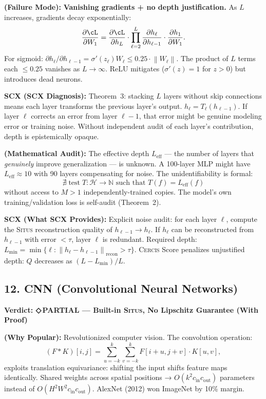 \documentclass[12pt,a4paper]{article}
\theoremstyle{definition}
\newcommand{\weakness}{{\color{weakcolor}\textbf{◇\,PARTIAL}}}
\newcommand{\Situs}{\textsc{Situs}}
\newcommand{\Cercis}{\textsc{Cercis}}
\newcommand{\N}{\mathbb{N}}
\newcommand{\cH}{\mathcal{H}}
\newcommand{\norm}[1]{\left\lVert#1\right\rVert}
\newcommand{\auditHeader}[1]{\medskip\noindent\textbf{\large #1}\medskip}
\newcommand{\whyPopular}{\noindent\textbf{ (Why Popular):} }
\newcommand{\whyFail}{\noindent\textbf{ (Failure Mode):} }
\newcommand{\whatMissing}{\noindent\textbf{SCX (What SCX Provides):} }
\newcommand{\diagnosis}{\noindent\textbf{SCX (SCX Diagnosis):} }
\newcommand{\mathAudit}{\noindent\textbf{ (Mathematical Audit):} }
\begin{document}
\whyFail{} \textbf{Vanishing gradients + no depth justification.} As $L$ increases, gradients decay exponentially:
\[
\frac{\partial \cL}{\partial W_1} = \frac{\partial \cL}{\partial h_L} \cdot \prod_{\ell=2}^L \frac{\partial h_\ell}{\partial h_{\ell-1}} \cdot \frac{\partial h_1}{\partial W_1}.
\]
For sigmoid: $\partial h_\ell / \partial h_{\ell-1} = \sigma'(z_\ell) W_\ell \le 0.25 \cdot \norm{W_\ell}$. The product of $L$ terms each $\le 0.25$ vanishes as $L \to \infty$. ReLU mitigates ($\sigma'(z) = 1$ for $z > 0$) but introduces dead neurons.

\diagnosis{} Theorem~3: stacking $L$ layers without skip connections means each layer transforms the previous layer's output. $h_\ell = T_\ell(h_{\ell-1})$. If layer $\ell$ corrects an error from layer $\ell-1$, that error might be genuine modeling error or training noise. Without independent audit of each layer's contribution, depth is epistemically opaque.

\mathAudit{} The effective depth $L_{\text{eff}}$ — the number of layers that \textit{genuinely} improve generalization — is unknown. A 100-layer MLP might have $L_{\text{eff}} \approx 10$ with 90 layers compensating for noise. The unidentifiability is formal:
\[
\nexists \; \text{test} \; T: \cH \to \N \text{ such that } T(f) = L_{\text{eff}}(f)
\]
without access to $M>1$ independently-trained copies. The model's own training/validation loss is self-audit (Theorem~2).

\whatMissing{} Explicit noise audit: for each layer $\ell$, compute the \Situs{} reconstruction quality of $h_{\ell-1} \to h_\ell$. If $h_\ell$ can be reconstructed from $h_{\ell-1}$ with error $< \tau$, layer $\ell$ is redundant. Required depth: $L_{\min} = \min\{\ell : \norm{h_\ell - h_{\ell-1}}_{\text{recon}} > \tau\}$. \Cercis{} Score penalizes unjustified depth: $Q$ decreases as $(L - L_{\min}) / L$.

\subsection{12. CNN (Convolutional Neural Networks) }

\auditHeader{Verdict: \weakness{} — Built-in \Situs{}, No Lipschitz Guarantee (With Proof)}

\whyPopular{} Revolutionized computer vision. The convolution operation:
\[
(F * K)[i, j] = \sum_{u=-k}^k \sum_{v=-k}^k F[i+u, j+v] \cdot K[u, v],
\]
exploits translation equivariance: shifting the input shifts feature maps identically. Shared weights across spatial positions → $O(k^2 c_{\text{in}} c_{\text{out}})$ parameters instead of $O(H^2 W^2 c_{\text{in}} c_{\text{out}})$. AlexNet (2012) won ImageNet by 10\% margin.
\end{document}
